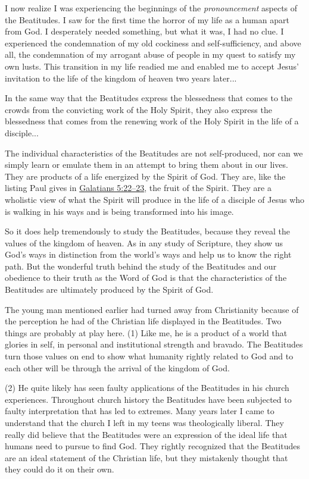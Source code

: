 			I now realize I was experiencing the beginnings of the \textit{pronouncement} aspects of the Beatitudes. I saw for the first time the horror of my life as a human apart from God. I desperately needed something, but what it was, I had no clue. I experienced the condemnation of my old cockiness and self-sufficiency, and above all, the condemnation of my arrogant abuse of people in my quest to satisfy my own lusts. This transition in my life readied me and enabled me to accept Jesus' invitation to the life of the kingdom of heaven two years later... 

			In the same way that the Beatitudes express the blessedness that comes to the crowds from the convicting work of the Holy Spirit, they also express the blessedness that comes from the renewing work of the Holy Spirit in the life of a disciple... 

			The individual characteristics of the Beatitudes are not self-produced, nor can we simply learn or emulate them in an attempt to bring them about in our lives. They are products of a life energized by the Spirit of God. They are, like the listing Paul gives in \hyperref[GALATIANS-5-22]{Galatians 5:22--23}, the fruit of the Spirit. They are a wholistic view of what the Spirit will produce in the life of a disciple of Jesus who is walking in his ways and is being transformed into his image. 

			So it does help tremendously to study the Beatitudes, because they reveal the values of the kingdom of heaven. As in any study of Scripture, they show us God's ways in distinction from the world's ways and help us to know the right path. But the wonderful truth behind the study of the Beatitudes and our obedience to their truth as the Word of God is that the characteristics of the Beatitudes are ultimately produced by the Spirit of God. 

			The young man mentioned earlier had turned away from Christianity because of the perception he had of the Christian life displayed in the Beatitudes. Two things are probably at play here. (1) Like me, he is a product of a world that glories in self, in personal and institutional strength and bravado. The Beatitudes turn those values on end to show what humanity rightly related to God and to each other will be through the arrival of the kingdom of God. 

			(2) He quite likely has seen faulty applications of the Beatitudes in his church experiences. Throughout church history the Beatitudes have been subjected to faulty interpretation that has led to extremes. Many years later I came to understand that the church I left in my teens was theologically liberal. They really did believe that the Beatitudes were an expression of the ideal life that humans need to pursue to find God. They rightly recognized that the Beatitudes are an ideal statement of the Christian life, but they mistakenly thought that they could do it on their own. 

